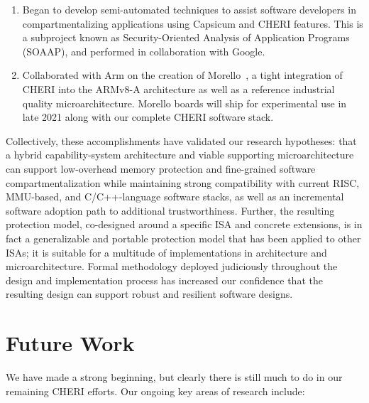 \begin{enumerate}
\item Began to develop semi-automated techniques to assist software
  developers in compartmentalizing applications using Capsicum and CHERI
  features.
  This is a subproject known as Security-Oriented Analysis of Application
  Programs (SOAAP), and performed in collaboration with Google.

\item Collaborated with Arm on the creation of Morello~\cite{arm-morello}, a
  tight integration of CHERI into the ARMv8-A architecture as well as a
  reference industrial quality microarchitecture.
  Morello boards will ship for experimental use in late 2021 along with our
  complete CHERI software stack.
\end{enumerate}

Collectively, these accomplishments have validated our research hypotheses:
that a hybrid capability-system architecture and viable supporting
microarchitecture can support low-overhead memory protection and fine-grained
software compartmentalization while maintaining strong compatibility with
current RISC, MMU-based, and C/C++-language software stacks, as well as an
incremental software adoption path to additional trustworthiness.
Further, the resulting protection model, co-designed around a specific ISA and
concrete extensions, is in fact a generalizable and portable protection model
that has been applied to other ISAs; it is suitable for a multitude of
implementations in architecture and microarchitecture.
Formal methodology deployed judiciously throughout the design and
implementation process has increased our confidence that the resulting design
can support robust and resilient software designs.

\section{Future Work}
We have made a strong beginning, but clearly there is still much to do in our
remaining CHERI efforts.
Our ongoing key areas of research include:

